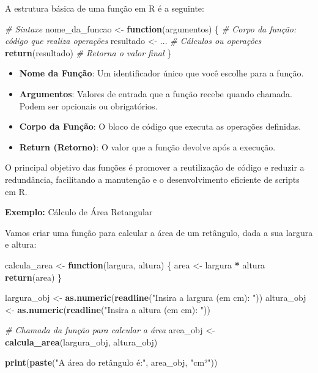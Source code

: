 \documentclass[
]{book}
\newenvironment{Shaded}{\begin{snugshade}}{\end{snugshade}}
\newcommand{\CommentTok}[1]{\textcolor[rgb]{0.56,0.35,0.01}{\textit{#1}}}
\newcommand{\ControlFlowTok}[1]{\textcolor[rgb]{0.13,0.29,0.53}{\textbf{#1}}}
\newcommand{\FunctionTok}[1]{\textcolor[rgb]{0.13,0.29,0.53}{\textbf{#1}}}
\newcommand{\NormalTok}[1]{#1}
\newcommand{\OtherTok}[1]{\textcolor[rgb]{0.56,0.35,0.01}{#1}}
\newcommand{\SpecialCharTok}[1]{\textcolor[rgb]{0.81,0.36,0.00}{\textbf{#1}}}
\newcommand{\StringTok}[1]{\textcolor[rgb]{0.31,0.60,0.02}{#1}}
\providecommand{\tightlist}{%
  \setlength{\itemsep}{0pt}\setlength{\parskip}{0pt}}
\begin{document}
A estrutura básica de uma função em R é a seguinte:

\begin{Shaded}
\begin{Highlighting}[]
\CommentTok{\# Sintaxe}
\NormalTok{nome\_da\_funcao }\OtherTok{\textless{}{-}} \ControlFlowTok{function}\NormalTok{(argumentos) \{}
  \CommentTok{\# Corpo da função: código que realiza operações}
\NormalTok{  resultado }\OtherTok{\textless{}{-}}\NormalTok{ ... }\CommentTok{\# Cálculos ou operações}
  \FunctionTok{return}\NormalTok{(resultado) }\CommentTok{\# Retorna o valor final}
\NormalTok{\}}
\end{Highlighting}
\end{Shaded}

\begin{itemize}
\tightlist
\item
  \textbf{Nome da Função}: Um identificador único que você escolhe para a
  função.
\item
  \textbf{Argumentos}: Valores de entrada que a função recebe quando
  chamada. Podem ser opcionais ou obrigatórios.
\item
  \textbf{Corpo da Função}: O bloco de código que executa as operações
  definidas.
\item
  \textbf{Return (Retorno)}: O valor que a função devolve após a execução.
\end{itemize}

O principal objetivo das funções é promover a reutilização de código e
reduzir a redundância, facilitando a manutenção e o desenvolvimento
eficiente de scripts em R.

\textbf{Exemplo:} Cálculo de Área Retangular

Vamos criar uma função para calcular a área de um retângulo, dada a sua
largura e altura:

\begin{Shaded}
\begin{Highlighting}[]
\NormalTok{calcula\_area }\OtherTok{\textless{}{-}} \ControlFlowTok{function}\NormalTok{(largura, altura) \{}
\NormalTok{  area }\OtherTok{\textless{}{-}}\NormalTok{ largura }\SpecialCharTok{*}\NormalTok{ altura}
  \FunctionTok{return}\NormalTok{(area)}
\NormalTok{\}}

\NormalTok{largura\_obj }\OtherTok{\textless{}{-}} \FunctionTok{as.numeric}\NormalTok{(}\FunctionTok{readline}\NormalTok{(}\StringTok{"Insira a largura (em cm): "}\NormalTok{))}
\NormalTok{altura\_obj }\OtherTok{\textless{}{-}} \FunctionTok{as.numeric}\NormalTok{(}\FunctionTok{readline}\NormalTok{(}\StringTok{"Insira a altura (em cm): "}\NormalTok{))}

\CommentTok{\# Chamada da função para calcular a área}
\NormalTok{area\_obj }\OtherTok{\textless{}{-}} \FunctionTok{calcula\_area}\NormalTok{(largura\_obj, altura\_obj) }

\FunctionTok{print}\NormalTok{(}\FunctionTok{paste}\NormalTok{(}\StringTok{"A área do retângulo é:"}\NormalTok{, area\_obj, }\StringTok{"cm²"}\NormalTok{))}
\end{Highlighting}
\end{Shaded}
\end{document}
